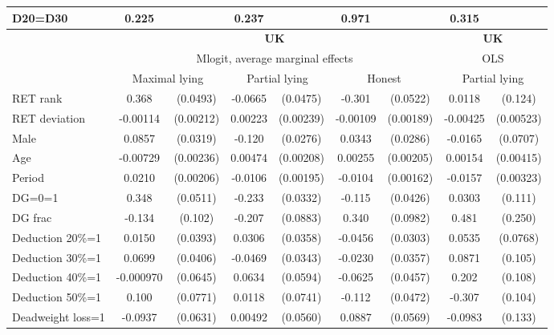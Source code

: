 \begin{tabular}{l|cccccc|cc}
D20=D30         &    0.225         &         &    0.237         &         &    0.971         &         &    0.315         &         \\
\hline\hline
&\multicolumn{6}{c|}{\bf UK}&\multicolumn{2}{c}{\bf UK}\\ &\multicolumn{6}{c|}{Mlogit, average marginal effects }&\multicolumn{2}{c}{OLS}\\
                &\multicolumn{2}{c}{Maximal lying}&\multicolumn{2}{c}{Partial lying}&\multicolumn{2}{c}{Honest}  &\multicolumn{2}{c}{Partial lying}\\
\hline
RET rank        &    0.368\sym{***}& (0.0493)&  -0.0665         & (0.0475)&   -0.301\sym{***}& (0.0522)&   0.0118         &  (0.124)\\
RET deviation   & -0.00114         &(0.00212)&  0.00223         &(0.00239)& -0.00109         &(0.00189)& -0.00425         &(0.00523)\\
Male            &   0.0857\sym{***}& (0.0319)&   -0.120\sym{***}& (0.0276)&   0.0343         & (0.0286)&  -0.0165         & (0.0707)\\
Age             & -0.00729\sym{***}&(0.00236)&  0.00474\sym{**} &(0.00208)&  0.00255         &(0.00205)&  0.00154         &(0.00415)\\
Period          &   0.0210\sym{***}&(0.00206)&  -0.0106\sym{***}&(0.00195)&  -0.0104\sym{***}&(0.00162)&  -0.0157\sym{***}&(0.00323)\\
DG=0=1          &    0.348\sym{***}& (0.0511)&   -0.233\sym{***}& (0.0332)&   -0.115\sym{***}& (0.0426)&   0.0303         &  (0.111)\\
DG frac         &   -0.134         &  (0.102)&   -0.207\sym{**} & (0.0883)&    0.340\sym{***}& (0.0982)&    0.481\sym{*}  &  (0.250)\\
Deduction 20\%=1&   0.0150         & (0.0393)&   0.0306         & (0.0358)&  -0.0456         & (0.0303)&   0.0535         & (0.0768)\\
Deduction 30\%=1&   0.0699\sym{*}  & (0.0406)&  -0.0469         & (0.0343)&  -0.0230         & (0.0357)&   0.0871         &  (0.105)\\
Deduction 40\%=1&-0.000970         & (0.0645)&   0.0634         & (0.0594)&  -0.0625         & (0.0457)&    0.202\sym{*}  &  (0.108)\\
Deduction 50\%=1&    0.100         & (0.0771)&   0.0118         & (0.0741)&   -0.112\sym{**} & (0.0472)&   -0.307\sym{***}&  (0.104)\\
Deadweight loss=1&  -0.0937         & (0.0631)&  0.00492         & (0.0560)&   0.0887         & (0.0569)&  -0.0983         &  (0.133)\\

\end{tabular}
